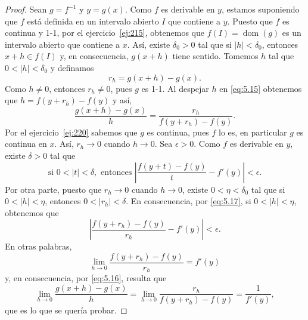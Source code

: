 \documentclass[12pt,a4paper]{book}
\DeclareMathOperator{\dom}{dom}
\begin{document}
    \begin{proof}
        Sean $g=f^{-1}$ y $y=g(x)$. Como $f$ es derivable en $y$, estamos
        suponiendo que $f$ está definida en un intervalo abierto $I$ que contiene a $y$.
        Puesto que $f$ es continua y 1-1, por el ejercicio~\ref{ej:215}, obtenemos que $f(I)=
        \dom(g)$ es un intervalo abierto que contiene a $x$. Así, existe $\delta_{0}>0$ tal que si
        $|h|<\delta_{0}$, entonces $x+h\in f(I)$ y, en consecuencia, $g(x+h)$ tiene sentido.
        Tomemos $h$ tal que $0<|h|<\delta_{0}$ y definamos
        \begin{equation}\label{eq:5.15}
            r_{h}=g(x+h)-g(x).
        \end{equation}
        Como $h\neq 0$, entonces $r_{h}\neq 0$, pues $g$ es 1-1. Al despejar $h$ en \eqref{eq:5.15} obtenemos
        que $h=f(y+r_{h})-f(y)$ y así,
        \begin{equation}\label{eq:5.16}
            \frac{g(x+h)-g(x)}{h}=\frac{r_{h}}{f(y+r_{h})-f(y)}.
        \end{equation}
        Por el ejercicio~\ref{ej:220} sabemos que $g$ es continua, pues $f$ lo es, en particular $g$
        es continua en $x$. Así, $r_{h}\to 0$ cuando $h\to 0$. Sea $\epsilon>0$. Como $f$ es derivable
        en $y$, existe $\delta>0$ tal que
        \begin{equation}\label{eq:5.17}
            \text{si }0<|t|<\delta,\text{ entonces }\left|\frac{f(y+t)-f(y)}{t}-f'(y)\right|<\epsilon.
        \end{equation}
        Por otra parte, puesto que $r_{h}\to 0$ cuando $h\to 0$, existe $0<\eta<\delta_{0}$ tal
        que si $0<|h|<\eta$, entonces $0<|r_{h}|<\delta$. En consecuencia, por \eqref{eq:5.17}, si
        $0<|h|<\eta$, obtenemos que
        \begin{equation*}
            \left|\frac{f(y+r_{h})-f(y)}{r_{h}}-f'(y)\right|<\epsilon.
        \end{equation*}
        En otras palabras,
        \begin{equation*}
            \lim_{h\to 0}\frac{f(y+r_{h})-f(y)}{r_{h}}=f'(y)
        \end{equation*}
        y, en consecuencia, por \eqref{eq:5.16}, resulta que
        \begin{equation*}
            \lim_{h\to 0}\frac{g(x+h)-g(x)}{h}=\lim_{h\to 0}\frac{r_{h}}{f(y+r_{h})-f(y)}=\frac{1}{f'(y)},
        \end{equation*}
        que es lo que se quería probar.
    \end{proof}
\end{document}
